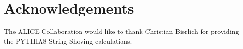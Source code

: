 \documentclass[ALICE,manyauthors]{cernphprep}
\begin{document}
\begin{titlepage}
\begin{abstract}


\end{abstract}

\end{titlepage}

\setcounter{page}{2}






\newenvironment{acknowledgement}{\relax}{\relax}
\begin{acknowledgement}
\section*{Acknowledgements}
\noindent The ALICE Collaboration would like to thank Christian Bierlich for providing the PYTHIA8 String Shoving calculations.
\end{acknowledgement}
\end{document}
